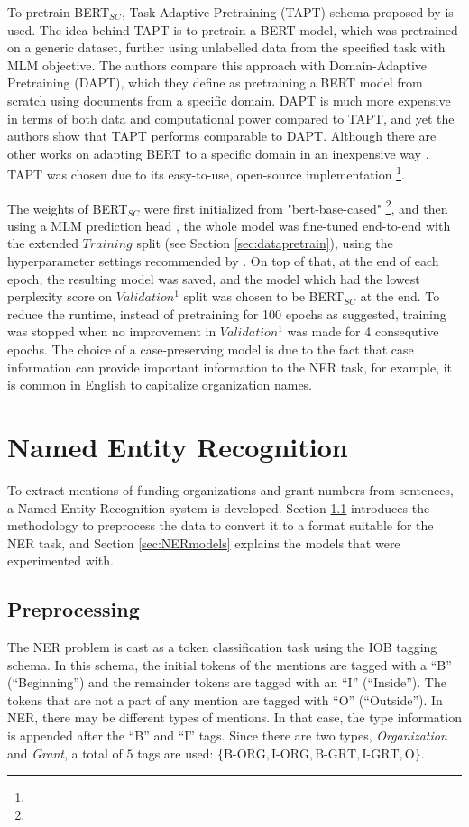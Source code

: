 \documentclass{report}
\theoremstyle{definition}
\theoremstyle{remark}
\begin{document}
To pretrain BERT$_{SC}$, Task-Adaptive Pretraining (TAPT) schema proposed by \cite{DontStop} is used. The idea behind TAPT is to pretrain a BERT model, which was pretrained on a generic dataset, further using unlabelled data from the specified task with MLM objective. The authors compare this approach with Domain-Adaptive Pretraining (DAPT), which they define as pretraining a BERT model from scratch using documents from a specific domain. DAPT is much more expensive in terms of both data and computational power compared to TAPT, and yet the authors show that TAPT performs comparable to DAPT. Although there are other works on adapting BERT to a specific domain in an inexpensive way \textcolor{red}{\cite{}}, TAPT was chosen due to its easy-to-use, open-source implementation \textcolor{red}{\footnote{}}.

The weights of BERT$_{SC}$ were first initialized from "bert-base-cased" \textcolor{red}{\footnote{}}, and then using a MLM prediction head \textcolor{red}{\cite{}}, the whole model was fine-tuned end-to-end with the extended $Training$ split (see Section \ref{sec:datapretrain}), using the hyperparameter settings recommended by \cite{DontStop}. On top of that, at the end of each epoch, the resulting model was saved, and the model which had the lowest perplexity score on $Validation^{1}$ split was chosen to be BERT$_{SC}$ at the end. To reduce the runtime, instead of pretraining for 100 epochs as suggested, training was stopped when no improvement in $Validation^{1}$ was made for 4 consequtive epochs. The choice of a case-preserving model is due to the fact that case information can provide important information to the NER task, for example, it is common in English to capitalize organization names.

\section{Named Entity Recognition}

To extract mentions of funding organizations and grant numbers from sentences, a Named Entity Recognition system is developed. Section \ref{sec:NERpre} introduces the methodology to preprocess the data to convert it to a format suitable for the NER task, and Section \ref{sec:NERmodels} explains the models that were experimented with.

\subsection{Preprocessing}
\label{sec:NERpre}
 The NER problem is cast as a token classification task using the IOB tagging schema. In this schema, the initial tokens of the mentions are tagged with a ``B'' (``Beginning'') and the remainder tokens are tagged with an ``I'' (``Inside''). The tokens that are not a part of any mention are tagged with ``O'' (``Outside''). In NER, there may be different types of mentions. In that case, the type information is appended after the ``B'' and ``I'' tags. Since there are two types, \textit{Organization} and \textit{Grant}, a total of $5$ tags are used: $\{ \text{B-ORG}, \text{I-ORG}, \text{B-GRT}, \text{I-GRT}, \text{O} \}$.
\end{document}
